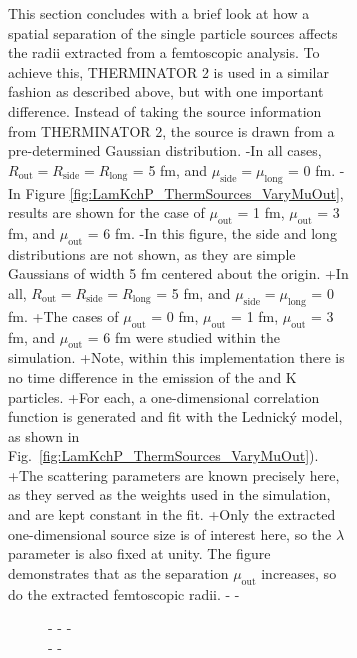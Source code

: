 \begin{figure}[h]
{\begin{table}[htbp]
\begin{figure}[h!]
{ This section concludes with a brief look at how a spatial separation of the single particle sources affects the radii extracted from a femtoscopic analysis.
 To achieve this, THERMINATOR 2 is used in a similar fashion as described above, but with one important difference.
 Instead of taking the source information from THERMINATOR 2, the source is drawn from a pre-determined Gaussian distribution.
-In all cases, $R_{\mathrm{out}} = R_{\mathrm{side}} = R_{\mathrm{long}}$ = 5 fm, and $\mu_{\mathrm{side}} = \mu_{\mathrm{long}}$ = 0 fm.
-In Figure \ref{fig:LamKchP_ThermSources_VaryMuOut}, results are shown for the case of $\mu_{\mathrm{out}}$ = 1 fm, $\mu_{\mathrm{out}}$ = 3 fm, and $\mu_{\mathrm{out}}$ = 6 fm.
-In this figure, the side and long distributions are not shown, as they are simple Gaussians of width 5 fm centered about the origin.
+In all, $R_{\mathrm{out}} = R_{\mathrm{side}} = R_{\mathrm{long}}$ = 5 fm, and $\mu_{\mathrm{side}} = \mu_{\mathrm{long}}$ = 0 fm.
+The cases of $\mu_{\mathrm{out}}$ = 0 fm, $\mu_{\mathrm{out}}$ = 1 fm, $\mu_{\mathrm{out}}$ = 3 fm, and $\mu_{\mathrm{out}}$ = 6 fm were studied within the simulation.
+Note, within this implementation there is no time difference in the emission of the \Lam and K particles.
+For each, a one-dimensional correlation function is generated and fit with the Lednick\'y model, as shown in Fig.\ \ref{fig:LamKchP_ThermSources_VaryMuOut}).
+The scattering parameters are known precisely here, as they served as the weights used in the simulation, and are kept constant in the fit.
+Only the extracted one-dimensional source size is of interest here, so the $\lambda$ parameter is also fixed at unity.
 The figure demonstrates that as the separation $\mu_{\mathrm{out}}$ increases, so do the extracted femtoscopic radii.
-
-\begin{figure}[h!]
-  \centering
-  %
-   \\
-  %
-  
\end{figure}}
\end{figure}
\end{table}}
\end{figure}
